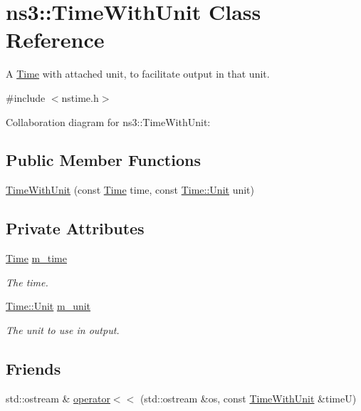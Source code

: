 \hypertarget{classns3_1_1TimeWithUnit}{}\section{ns3\+:\+:Time\+With\+Unit Class Reference}
\label{classns3_1_1TimeWithUnit}


A \hyperlink{classns3_1_1Time}{Time} with attached unit, to facilitate output in that unit.  




{\ttfamily \#include $<$nstime.\+h$>$}



Collaboration diagram for ns3\+:\+:Time\+With\+Unit\+:
\subsection*{Public Member Functions}
\begin{DoxyCompactItemize}
\item 
\hyperlink{classns3_1_1TimeWithUnit_acdc9270d4e53efeef2db9b2e4e584b85}{Time\+With\+Unit} (const \hyperlink{classns3_1_1Time}{Time} time, const \hyperlink{classns3_1_1Time_a87a7f4d29c68b047a72d291ad660295a}{Time\+::\+Unit} unit)
\end{DoxyCompactItemize}
\subsection*{Private Attributes}
\begin{DoxyCompactItemize}
\item 
\hyperlink{classns3_1_1Time}{Time} \hyperlink{classns3_1_1TimeWithUnit_ae9d213eec512d83f5ad6677fa4c028dd}{m\+\_\+time}
\begin{DoxyCompactList}\small\item\em The time. \end{DoxyCompactList}\item 
\hyperlink{classns3_1_1Time_a87a7f4d29c68b047a72d291ad660295a}{Time\+::\+Unit} \hyperlink{classns3_1_1TimeWithUnit_afa2cf9b8cbc6c6b3e951981d6fa3643b}{m\+\_\+unit}
\begin{DoxyCompactList}\small\item\em The unit to use in output. \end{DoxyCompactList}\end{DoxyCompactItemize}
\subsection*{Friends}
\begin{DoxyCompactItemize}
\item 
std\+::ostream \& \hyperlink{classns3_1_1TimeWithUnit_a5fe7ca835d00ca377c0da9dd0f91c02d}{operator$<$$<$} (std\+::ostream \&os, const \hyperlink{classns3_1_1TimeWithUnit}{Time\+With\+Unit} \&timeU)
\end{DoxyCompactItemize}


